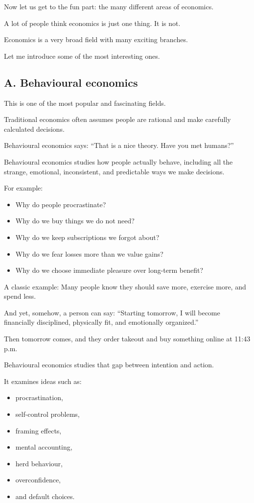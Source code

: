 \documentclass[12pt]{article}
\begin{document}
Now let us get to the fun part: the many different areas of economics.

A lot of people think economics is just one thing. It is not.

Economics is a very broad field with many exciting branches.

Let me introduce some of the most interesting ones.

\subsection*{A. Behavioural economics}

This is one of the most popular and fascinating fields.

Traditional economics often assumes people are rational and make carefully calculated decisions.

Behavioural economics says:  
``That is a nice theory. Have you met humans?''

Behavioural economics studies how people actually behave, including all the strange, emotional, inconsistent, and predictable ways we make decisions.

For example:
\begin{itemize}[leftmargin=2em]
    \item Why do people procrastinate?
    \item Why do we buy things we do not need?
    \item Why do we keep subscriptions we forgot about?
    \item Why do we fear losses more than we value gains?
    \item Why do we choose immediate pleasure over long-term benefit?
\end{itemize}

A classic example:  
Many people know they should save more, exercise more, and spend less.

And yet, somehow, a person can say:  
``Starting tomorrow, I will become financially disciplined, physically fit, and emotionally organized.''

Then tomorrow comes, and they order takeout and buy something online at 11:43 p.m.

Behavioural economics studies that gap between intention and action.

It examines ideas such as:
\begin{itemize}[leftmargin=2em]
    \item procrastination,
    \item self-control problems,
    \item framing effects,
    \item mental accounting,
    \item herd behaviour,
    \item overconfidence,
    \item and default choices.
\end{itemize}
\end{document}
